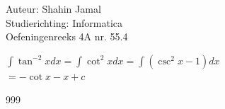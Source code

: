 \documentclass[a4paper]{article}
\begin{document}
  
\noindent \large Auteur: Shahin Jamal \\
\noindent \large Studierichting: Informatica\\
\noindent \large Oefeningenreeks 4A nr. 55.4\\

\medskip

\normalsize

$\displaystyle\int \tan^{-2}x dx = \displaystyle\int \cot^2x dx = \displaystyle\int (\csc^2x - 1)dx$\\

$= -\cot x - x + c$\\

\begin{thebibliography}{999}
\end{thebibliography}
\end{document}
